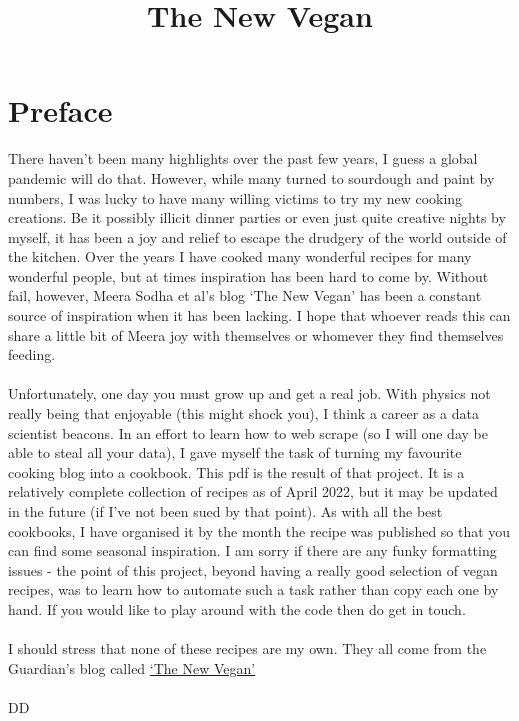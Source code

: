 \documentclass{book}
\title{The New Vegan}
\begin{document}
\frontmatter
\maketitle
\section*{Preface}
There haven't been many highlights over the past few years, I guess a global pandemic will do that. However, while many turned to sourdough and paint by numbers, I was lucky to have many willing victims to try my new cooking creations. Be it possibly illicit dinner parties or even just quite creative nights by myself, it has been a joy and relief to escape the drudgery of the world outside of the kitchen. Over the years I have cooked many wonderful recipes for many wonderful people, but at times inspiration has been hard to come by. Without fail, however, Meera Sodha et al's blog `The New Vegan' has been a constant source of inspiration when it has been lacking. I hope that whoever reads this can share a little bit of Meera joy with themselves or whomever they find themselves feeding. \\ \\ 
%
Unfortunately, one day you must grow up and get a real job. With physics not really being that enjoyable (this might shock you), I think a career as a data scientist beacons. In an effort to learn how to web scrape (so I will one day be able to steal all your data), I gave myself the task of turning my favourite cooking blog into a cookbook. This pdf is the result of that project. It is a relatively complete collection of recipes as of April 2022, but it may be updated in the future (if I've not been sued by that point). As with all the best cookbooks, I have organised it by the month the recipe was published so that you can find some seasonal inspiration. I am sorry if there are any funky formatting issues - the point of this project, beyond having a really good selection of vegan recipes, was to learn how to automate such a task rather than copy each one by hand. If you would like to play around with the code then do get in touch. \\ \\
%
I should stress that none of these recipes are my own. They all come from the Guardian's blog called \href{https://www.theguardian.com/food/series/the-new-vegan}{`The New Vegan'} \\ \\
%
DD 

\tableofcontents
\end{document}
